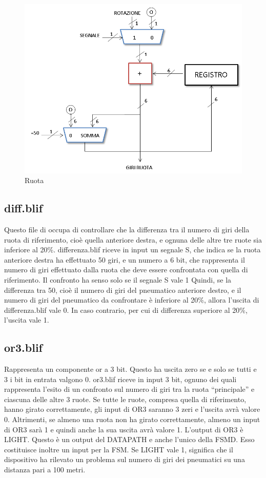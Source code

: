 \documentclass[a4paper,titlepage]{book}
\begin{document}
\begin{figure}[!hb]
\centering
\includegraphics[scale=0.5]{schemi/ruota.png}
\caption{Ruota}
\end{figure}


\subsection{diff.blif}

Questo file di occupa di controllare che la differenza tra il numero di giri della ruota di  riferimento, cioè quella anteriore destra, e ognuna delle altre tre ruote sia inferiore al 20\%.  differenza.blif riceve in input un segnale S, che indica se la ruota anteriore destra ha  effettuato 50 giri, e un numero a 6 bit, che rappresenta il numero di giri effettuato dalla  ruota che deve essere confrontata con quella di riferimento. Il confronto ha senso solo se  il segnale S vale 1  Quindi, se la differenza tra 50, cioè il numero di giri del pneumatico anteriore destro, e il  numero di giri del pneumatico da confrontare è inferiore al 20\%, allora l'uscita di  differenza.blif vale 0. In caso contrario, per cui di differenza superiore al 20\%, l'uscita vale  1.


\subsection{or3.blif}

Rappresenta un componente or a 3 bit. Questo ha uscita zero se e solo se tutti e 3 i bit in  entrata valgono 0.  or3.blif riceve in input 3 bit, ognuno dei quali rappresenta l'esito di un confronto sul  numero di giri tra la ruota “principale” e ciascuna delle altre 3 ruote.  Se tutte le ruote, compresa quella di riferimento, hanno girato correttamente, gli input di  OR3 saranno 3 zeri e l'uscita avrà valore 0.  Altrimenti, se almeno una ruota non ha girato correttamente, almeno un input di OR3 sarà  1 e quindi anche la sua uscita avrà valore 1.  L'output di OR3 è LIGHT. Questo è un output del DATAPATH e anche l'unico della FSMD.  Esso costituisce inoltre un input per la FSM.  Se LIGHT vale 1, significa che il dispositivo ha rilevato un problema sul numero di giri dei  pneumatici su una distanza pari a 100 metri.
\end{document}
